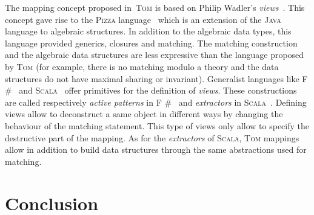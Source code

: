 \documentclass[runningheads]{llncs}
\newcommand{\scala}{\textsc{Scala}}
\newcommand{\pizza}{\textsc{Pizza}}
\newcommand{\tom}{\textsc{Tom}}
\newcommand{\java}{\textsc{Java}}
\newcommand{\fsharp}{\textsf{F \#}}
\begin{document}
The mapping concept proposed in~{\tom} is based on Philip
Wadler's \emph{views}~\cite{wadler87}. This concept gave rise to the {\pizza}
language~\cite{odersky97pizza} which is an extension of the {\java} language to
algebraic structures. In addition to the algebraic data types, this language
provided generics, closures and matching. The matching construction and the algebraic data
structures are less expressive than the language proposed by {\tom}
(for example, there is no matching modulo a theory and the data structures do not have
 maximal sharing or invariant). Generalist languages like
{\fsharp}~\cite{fsharp} and \scala~\cite{scala} offer primitives for the
definition of \emph{views}. These constructions are called respectively
\emph{active patterns} in {\fsharp}~\cite{syme07} and \emph{extractors} in
{\scala}~\cite{emir07}.  Defining views allow to deconstruct a same object in
different ways by changing the behaviour of the matching statement. This type
of views only allow to specify the destructive part of the mapping.  As for
the \emph{extractors} of {\scala}, {\tom} mappings allow in addition to
build data structures through the same abstractions used for matching.

\section{Conclusion}



\end{document}
